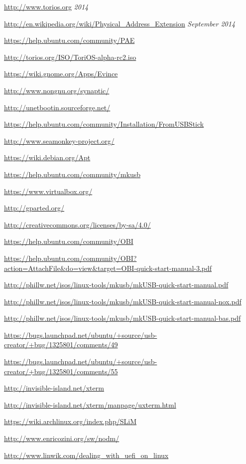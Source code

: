 \documentclass[12pt,a4paper]{book}
\begin{document}
\begin{thebibliography}{1} %

\url{http://www.torios.org}
\emph{2014}

\url{http://en.wikipedia.org/wiki/Physical_Address_Extension}
\emph{September 2014}

\url{https://help.ubuntu.com/community/PAE}

\url{http://torios.org/ISO/ToriOS-alpha-rc2.iso}

\url{https://wiki.gnome.org/Apps/Evince}

\url{http://www.nongnu.org/synaptic/}

\url{http://unetbootin.sourceforge.net/}

\url{https://help.ubuntu.com/community/Installation/FromUSBStick}

\url{http://www.seamonkey-project.org/}

\url{https://wiki.debian.org/Apt}

	
\url{https://help.ubuntu.com/community/mkusb}

\url{https://www.virtualbox.org/}

\url{http://gparted.org/}

\url{http://creativecommons.org/licenses/by-sa/4.0/}

\url{https://help.ubuntu.com/community/OBI	}

\url{https://help.ubuntu.com/community/OBI?action=AttachFile&do=view&target=OBI-quick-start-manual-3.pdf}
	
\url{http://phillw.net/isos/linux-tools/mkusb/mkUSB-quick-start-manual.pdf}
	
	
\url{http://phillw.net/isos/linux-tools/mkusb/mkUSB-quick-start-manual-nox.pdf}

\url{http://phillw.net/isos/linux-tools/mkusb/mkUSB-quick-start-manual-bas.pdf}
	
\url{https://bugs.launchpad.net/ubuntu/+source/usb-creator/+bug/1325801/comments/49}

\url{https://bugs.launchpad.net/ubuntu/+source/usb-creator/+bug/1325801/comments/55}		

\url{http://invisible-island.net/xterm}

\url{http://invisible-island.net/xterm/manpage/uxterm.html}
			
\url{https://wiki.archlinux.org/index.php/SLiM}


\url{http://www.enricozini.org/sw/nodm/}	

\url{http://www.linwik.com/dealing_with_uefi_on_linux}			
\end{thebibliography}

	
\newpage

\printindex

\newpage
\end{document}

